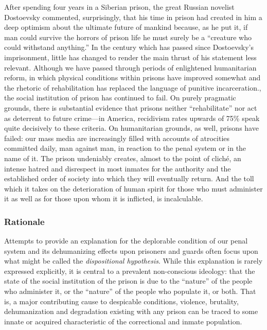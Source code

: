 \begin{refsection}
After spending four years in a Siberian prison, the great Russian novelist Dostoevsky commented, surprisingly, that his time in prison had created in him a deep optimism about the ultimate future of mankind because, as he put it, if man could survive the horrors of prison life he must surely be a “creature who could withstand anything.” In the century which has passed since Dostoevsky’s imprisonment, little has changed to render the main thrust of his statement less relevant. Although we have passed through periods of enlightened humanitarian reform, in which physical conditions within prisons have improved somewhat and the rhetoric of rehabilitation has replaced the language of punitive incarceration., the social institution of prison has continued to fail. On purely pragmatic grounds, there is substantial evidence that prisons neither “rehabilitate” nor act as deterrent to future crime—in America, recidivism rates upwards of 75\% speak quite decisively to these criteria. On humanitarian grounds, as well, prisons have failed: our mass media are increasingly filled with accounts of atrocities committed daily, man against man, in reaction to the penal system or in the name of it. The prison undeniably creates, almost to the point of cliché, an intense hatred and disrespect in most inmates for the authority and the established order of society into which they will eventually return. And the toll which it takes on the deterioration of human spirit for those who must administer it as well as for those upon whom it is inflicted, is incalculable.

\subsubsection{Rationale}
\label{rationale}

Attempts to provide an explanation for the deplorable condition of our penal system and its dehumanizing effects upon prisoners and guards often focus upon what might be called the \emph{dispositional hypothesis}. While this explanation is rarely expressed explicitly, it is central to a prevalent non-conscious ideology: that the state of the social institution of the prison is due to the “nature” of the people who administer it, or the “nature” of the people who populate it, or both. That is, a major contributing cause to despicable conditions, violence, brutality, dehumanization and degradation existing with any prison can be traced to some innate or acquired characteristic of the correctional and inmate population.


\end{refsection}
